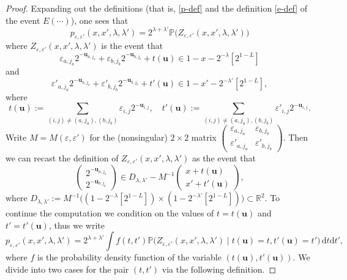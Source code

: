 \documentclass[11pt,reqno]{amsart}
\numberwithin{equation}{section}
\theoremstyle{definition}
\theoremstyle{remark}
\newcommand{\mb}{\mathbb}
\newcommand{\mbf}{\mathbf}
\newcommand{\eps}{\varepsilon}
\newcommand\R{\mathbb{R}}
\begin{document}
\begin{proof}
Expanding out the definitions (that is, \cref{p-def} and the definition \cref{e-def} of the event $E(\cdots)$), one sees that 
\[ p_{\eps, \eps'}(x, x', \lambda, \lambda') = 2^{\lambda + \lambda'} \mb{P}\big(  Z_{\eps,\eps'}(x,x' ,\lambda,\lambda') \big) \] where
$Z_{\eps,\eps'}(x,x',\lambda,\lambda')$ is the event that 
\[ \eps_{a,j_a}  2^{-\mbf{u}_{a,j_a}} +  \eps_{b,j_b} 2^{-\mbf{u}_{b,j_b}} + t(\mbf{u}) \in 1 - x - 2^{-\lambda} [ 2^{1 - L}]\] and \[ \eps'_{a,j_a} 2^{-\mbf{u}_{a,j_a}} + \eps'_{b,j_b} 2^{-\mbf{u}_{b,j_b}} + t'(\mbf{u}) \in 1 - x' - 2^{-\lambda'} [ 2^{1 - L}] , \] where
\begin{equation*} t(\mbf{u}) :=  \sum_{(i,j) \neq (a, j_a), (b, j_b)} \eps_{i,j} 2^{-\mbf{u}_{i,j}},  \quad t'(\mbf{u}) :=  \sum_{(i,j) \neq (a, j_a), (b, j_b)} \eps'_{i,j} 2^{-\mbf{u}_{i,j}}.\end{equation*}
Write $M = M(\eps, \eps')$ for the (nonsingular) $2 \times 2$ matrix $\left(\begin{smallmatrix} \eps_{a,j_a} & \eps_{b, j_b}  \\ \eps'_{a,j_a} & \eps'_{b, j_b}\end{smallmatrix}\right)$. Then we can recast the definition of $Z_{\eps,\eps'}(x,x',\lambda,\lambda')$ as the event that 
\begin{equation}\label{star}  \left(\begin{smallmatrix} 2^{-\mbf{u}_{a, j_a}} \\ 2^{-\mbf{u}_{b, j_b}}\end{smallmatrix}\right)  \in D_{\lambda,\lambda'} - M^{-1} \left(\begin{smallmatrix} x + t(\mbf{u}) \\  x' + t'(\mbf{u})\end{smallmatrix}\right) , \end{equation} 
where $D_{\lambda,\lambda'} := M^{-1} \big( (1 - 2^{-\lambda}[2^{1-L}]) \times (1 - 2^{-\lambda'}[2^{1-L}])\big) \subset \R^2$.
To continue the computation we condition on the values of $t = t(\mbf{u})$ and $t' = t'(\mbf{u})$, thus we write 
\begin{equation}\label{pepseps-cond}  p_{\eps,\eps'}(x,x',\lambda,\lambda') = 2^{\lambda+\lambda'} \int f(t,t')  \mb{P} \big(Z_{\eps,\eps'}(x,x',\lambda,\lambda') \mid t(\mbf{u}) = t, t'(\mbf{u}) = t' \big) \,\mathrm{d} t \mathrm{d}t' ,\end{equation} where $f$ is the probability density function of the variable $(t(\mbf{u}),t'(\mbf{u}))$.
We divide into two cases for the pair $(t, t')$ via the following definition.


\end{proof}
\end{document}
